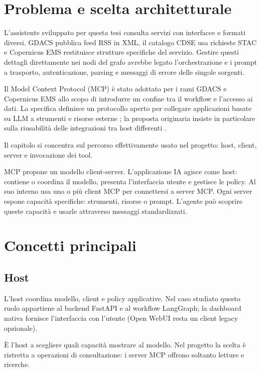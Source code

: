 \section{Problema e scelta architetturale}

L'assistente sviluppato per questa tesi consulta servizi con interfacce e formati
diversi. GDACS pubblica feed RSS in XML, il catalogo CDSE usa richieste STAC e
Copernicus EMS restituisce strutture specifiche del servizio. Gestire questi
dettagli direttamente nei nodi del grafo avrebbe legato l'orchestrazione e i
prompt a trasporto, autenticazione, parsing e messaggi di errore delle singole
sorgenti.

Il Model Context Protocol (MCP) è stato adottato per i rami GDACS e Copernicus
EMS allo scopo di introdurre un confine tra il workflow e l'accesso ai dati. La
specifica definisce un protocollo aperto per collegare applicazioni basate su LLM
a strumenti e risorse esterne \cite{mcpSpec}; la proposta originaria insiste in
particolare sulla riusabilità delle integrazioni tra host differenti
\cite{anthropicMCP}.

Il capitolo si concentra sul percorso effettivamente usato nel progetto: host,
client, server e invocazione dei tool.

MCP propone un modello client-server. L'applicazione IA agisce come host: contiene o coordina il modello, presenta l'interfaccia utente e gestisce le policy. Al suo interno usa uno o più client MCP per connettersi a server MCP. Ogni server espone capacità specifiche: strumenti, risorse o prompt. L'agente può scoprire queste capacità e usarle attraverso messaggi standardizzati.

\section{Concetti principali}

\subsection{Host}

L'host coordina modello, client e policy applicative. Nel caso studiato questo
ruolo appartiene al backend FastAPI e al workflow LangGraph; la dashboard nativa
fornisce l'interfaccia con l'utente (Open WebUI resta un client legacy
opzionale).

È l'host a scegliere quali capacità mostrare al modello. Nel progetto la scelta è
ristretta a operazioni di consultazione: i server MCP offrono soltanto letture e
ricerche.

